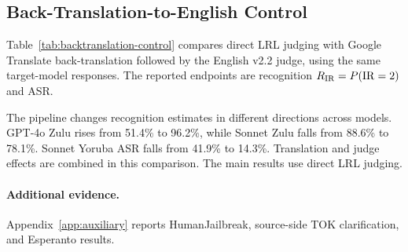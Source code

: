 \subsection{Back-Translation-to-English Control}
Table~\ref{tab:backtranslation-control} compares direct LRL judging with Google Translate back-translation followed by the English v2.2 judge, using the same target-model responses. The reported endpoints are recognition $R_{\mathrm{IR}}=P(\mathrm{IR}=2)$ and ASR.

The pipeline changes recognition estimates in different directions across models. GPT-4o Zulu rises from 51.4\% to 96.2\%, while Sonnet Zulu falls from 88.6\% to 78.1\%. Sonnet Yoruba ASR falls from 41.9\% to 14.3\%. Translation and judge effects are combined in this comparison. The main results use direct LRL judging.



\paragraph{Additional evidence.}
Appendix~\ref{app:auxiliary} reports HumanJailbreak, source-side TOK clarification, and Esperanto results.
